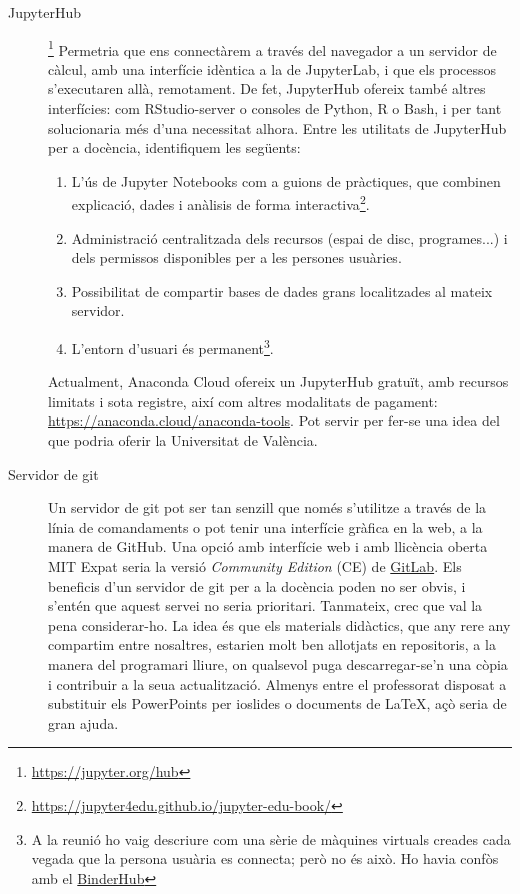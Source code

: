\documentclass[a4paper,12pt]{article}
\begin{document}
\begin{description}
   \item[JupyterHub]\footnote{\href{https://jupyter.org/hub}{https://jupyter.org/hub}} Permetria
que ens connectàrem a través del navegador
a un servidor de càlcul, amb una interfície idèntica a la de JupyterLab, i que els
processos s'executaren allà, remotament. De fet, JupyterHub ofereix també altres interfícies:
com RStudio-server o consoles de Python, R o Bash, i per tant solucionaria més d'una
necessitat alhora. Entre les utilitats de JupyterHub per a docència, identifiquem les
següents:
   \begin{enumerate}
   \item L'ús de Jupyter Notebooks com a guions de pràctiques, que combinen explicació,
         dades i anàlisis de forma interactiva\footnote{\href{https://jupyter4edu.github.io/jupyter-edu-book/}{https://jupyter4edu.github.io/jupyter-edu-book/}}.
   \item Administració centralitzada dels recursos (espai de disc, programes...) i dels permissos
         disponibles per a les persones usuàries.
   \item Possibilitat de compartir bases de dades grans localitzades al mateix servidor.
   \item L'entorn d'usuari és permanent\footnote{A la reunió ho vaig descriure com una sèrie de màquines virtuals creades cada vegada que la persona usuària es connecta; però no és això. Ho havia confòs amb el \href{https://jupyter.org/binder}{BinderHub}}.
   \end{enumerate}

Actualment, Anaconda Cloud ofereix un JupyterHub gratuït, amb recursos limitats i sota
registre, així com altres modalitats de pagament: \href{https://anaconda.cloud/anaconda-tools}{https://anaconda.cloud/anaconda-tools}.
Pot servir per fer-se una idea del que podria oferir la Universitat de València.

   \item[Servidor de git] Un servidor de \textsf{git} pot ser tan senzill que només
s'utilitze a través de la línia de comandaments o pot tenir una interfície gràfica en la web,
a la manera de GitHub. Una opció amb interfície web i amb llicència oberta MIT Expat seria
la versió \emph{Community Edition} (CE) de \href{https://gitlab.com/gitlab-org/gitlab-foss/-/blob/master/README.md}{GitLab}. Els beneficis d'un servidor de git per a la docència poden no
ser obvis, i s'entén que aquest servei no seria prioritari. Tanmateix, crec que val la pena
considerar-ho. La idea és que els materials didàctics, que any rere any compartim entre
nosaltres, estarien molt ben allotjats en repositoris, a la manera del programari lliure,
on qualsevol puga descarregar-se'n una còpia i contribuir a la seua actualització. Almenys
entre el professorat disposat a substituir els PowerPoints per ioslides o documents de \LaTeX,
açò seria de gran ajuda.


\end{description}
\end{document}
